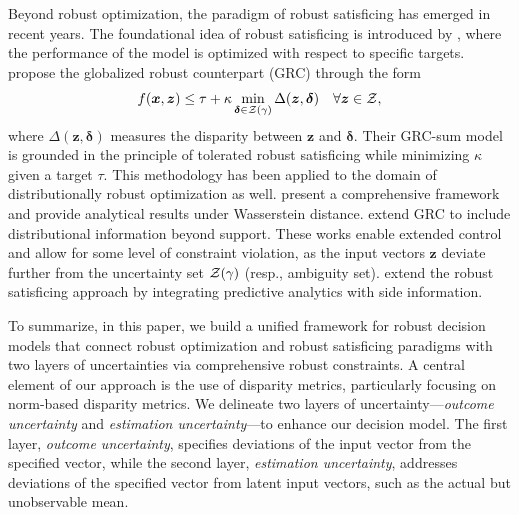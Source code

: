 \documentclass[opre, nonblindrev]{informswp}
\newcommand{\1}[1]{\mathds{1}{\left(#1\right)}}
\begin{document}
Beyond robust optimization, the paradigm of robust satisficing has emerged in recent years. The foundational idea of robust satisficing is introduced by \cite{Brown_Sim_2009}, where the performance of the model is optimized with respect to specific targets. \cite{BenTal_et_al_2017globalized} propose the globalized robust counterpart (GRC) through the form
$$
f(\bm x, \bm z) \leq \tau + \kappa \min_{\bm \delta \in \mathcal{Z}(\gamma)} \Delta(\bm z, \bm \delta) ~~~\forall \bm z \in \mathcal{Z},
$$
where $\Delta(\bm z, \bm \delta)$ measures the disparity between $\bm z$ and $\bm \delta$. Their GRC-sum model is grounded in the principle of tolerated robust satisficing while minimizing $\kappa$ given a target $\tau$. This methodology has been applied to the domain of distributionally robust optimization as well. \cite{Long_Sim_Zhou_2023robust} present a comprehensive framework and provide analytical results under Wasserstein distance. \cite{liu2023globalized} extend GRC to include distributional information beyond support. These works enable extended control and allow for some level of constraint violation, as the input vectors $\bm z$ deviate further from the uncertainty set $\mathcal{Z}(\gamma)$ (resp., ambiguity set). \cite{sim2021analytics} extend the robust satisficing approach by integrating predictive analytics with side information.

To summarize, in this paper, we build a unified framework for robust decision models that connect robust optimization and robust satisficing paradigms with two layers of uncertainties via comprehensive robust constraints. A central element of our approach is the use of disparity metrics, particularly focusing on norm-based disparity metrics. We delineate two layers of uncertainty---\emph{outcome uncertainty} and \emph{estimation uncertainty}---to enhance our decision model. The first layer, \emph{outcome uncertainty}, specifies deviations of the input vector from the specified vector, while the second layer, \emph{estimation uncertainty}, addresses deviations of the specified vector from latent input vectors, such as the actual but unobservable mean.
\end{document}
